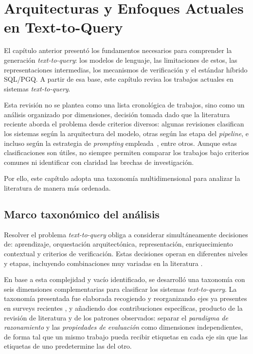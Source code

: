 
\chapter{Arquitecturas y Enfoques Actuales en Text-to-Query}
\label{chap:stateoftheart}

El capítulo anterior presentó los fundamentos necesarios para comprender la generación \emph{text-to-query}: los modelos de lenguaje, las limitaciones de estos, las representaciones intermedias, los mecanismos de verificación y el estándar híbrido \ac{SQL}/\ac{PGQ}. A partir de esa base, este capítulo revisa los trabajos actuales en sistemas \emph{text-to-query}.

Esta revisión no se plantea como una lista cronológica de trabajos, sino como un análisis organizado por dimensiones, decisión tomada dado que la literatura reciente aborda el problema desde criterios diversos: algunas revisiones clasifican los sistemas según la arquitectura del modelo, otras según las etapa del \emph{pipeline}, e incluso según la estrategia de \emph{prompting} empleada~\cite{NLinterfaces}, entre otros. Aunque estas clasificaciones son útiles, no siempre permiten comparar los trabajos bajo criterios comunes ni identificar con claridad las brechas de investigación.

Por ello, este capítulo adopta una taxonomía multidimensional para analizar la literatura de manera más ordenada.

\section{Marco taxonómico del análisis}
\label{sec:sota-taxonomia}

Resolver el problema \emph{text-to-query} obliga a considerar simultáneamente decisiones de: aprendizaje, orquestación arquitectónica, representación, enriquecimiento contextual y criterios de verificación. Estas decisiones operan en diferentes niveles y etapas, incluyendo combinaciones muy variadas en la literatura \cite{hong2024llmtext2sql,shi2025surveyllmtext2sql,liu2025nli4db}. 

En base a esta complejidad y vacío identificado, se desarrolló una taxonomía con seis dimensiones complementarias para clasificar los sistemas \emph{text-to-query}. La taxonomía presentada fue elaborada recogiendo y reorganizando ejes ya presentes en surveys recientes \cite{hong2024llmtext2sql,liu2024nl2sqlsurvey,shi2025surveyllmtext2sql,qin2022recentadvances},
y añadiendo dos contribuciones específicas, producto de la revisión de literatura y de los patrones observados: separar el \emph{paradigma de razonamiento} y las \emph{propiedades de evaluación} como dimensiones independientes, de forma tal que un mismo trabajo pueda recibir etiquetas en cada eje sin que las etiquetas de uno predetermine las del otro.

